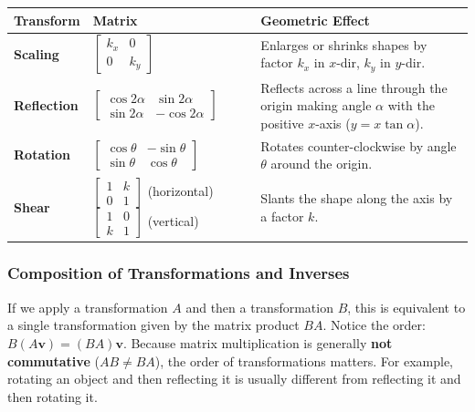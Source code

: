 \begin{center}
\renewcommand{\arraystretch}{1.5}
\begin{tabular}{p{2cm} p{4.5cm} p{6.5cm}}
\hline
\textbf{Transform} & \textbf{Matrix} & \textbf{Geometric Effect} \\
\hline
\textbf{Scaling} & 
$\begin{bmatrix} k_x & 0 \\ 0 & k_y \end{bmatrix}$ & 
Enlarges or shrinks shapes by factor $k_x$ in $x$-dir, $k_y$ in $y$-dir. \\

\textbf{Reflection} & 
$\begin{bmatrix} \cos 2\alpha & \sin 2\alpha \\ \sin 2\alpha & -\cos 2\alpha \end{bmatrix}$ & 
Reflects across a line through the origin making angle $\alpha$ with the positive $x$-axis ($y = x\tan\alpha$). \\

\textbf{Rotation} & 
$\begin{bmatrix} \cos\theta & -\sin\theta \\ \sin\theta & \cos\theta \end{bmatrix}$ & 
Rotates counter-clockwise by angle $\theta$ around the origin. \\

\textbf{Shear} & 
$\begin{bmatrix} 1 & k \\ 0 & 1 \end{bmatrix}$ (horizontal) \newline 
$\begin{bmatrix} 1 & 0 \\ k & 1 \end{bmatrix}$ (vertical) & 
Slants the shape along the axis by a factor $k$. \\
\hline
\end{tabular}
\end{center}

\subsubsection*{Composition of Transformations and Inverses}

If we apply a transformation $A$ and then a transformation $B$, this is equivalent to a single transformation given by the matrix product $BA$. Notice the order: $B(A\mathbf{v}) = (BA)\mathbf{v}$. 
Because matrix multiplication is generally \textbf{not commutative} ($AB \neq BA$), the order of transformations matters. For example, rotating an object and then reflecting it is usually different from reflecting it and then rotating it.

